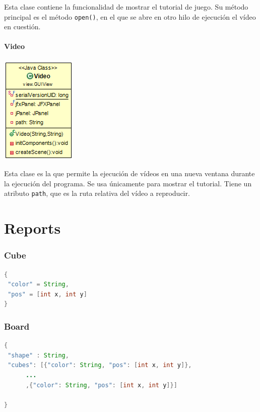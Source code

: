 \documentclass[../DocumentoOficial.tex]{subfiles}
\begin{document}
Esta clase contiene la funcionalidad de mostrar el tutorial de juego. Su método principal es el método \texttt{open()}, en el que se abre en otro hilo de ejecución el vídeo en cuestión.

\newpage

\subsubsection{Video}

\begin{center}
\includegraphics[scale=0.9]{Video-sprint7.png}\\
\end{center}

Esta clase es la que permite la ejecución de vídeos en una nueva ventana durante la ejecución del programa. Se usa únicamente para mostrar el tutorial. Tiene un atributo \texttt{path}, que es la ruta relativa del vídeo a reproducir.

\appendix

\chapter{Reports}
\label{ch:Anexo A}
\subsection*{Cube}

\begin{lstlisting}[frame=single, language=Java]
{
 "color" = String,
 "pos" = [int x, int y]
}
\end{lstlisting}

\subsection*{Board}
\begin{lstlisting}[frame=single, language=Java]
{
 "shape" : String,
 "cubes": [{"color": String, "pos": [int x, int y]},
 	  ...
 	  ,{"color": String, "pos": [int x, int y]}]

}
\end{lstlisting}
\end{document}
